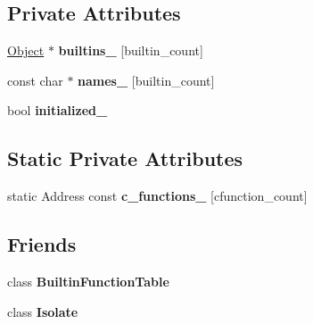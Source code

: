 \subsection*{Private Attributes}
\begin{DoxyCompactItemize}
\item 
\hyperlink{classv8_1_1internal_1_1_object}{Object} $\ast$ {\bfseries builtins\+\_\+} \mbox{[}builtin\+\_\+count\mbox{]}\hypertarget{classv8_1_1internal_1_1_builtins_a417f3c630e4ec2cf76865fc58a07a2e1}{}\label{classv8_1_1internal_1_1_builtins_a417f3c630e4ec2cf76865fc58a07a2e1}

\item 
const char $\ast$ {\bfseries names\+\_\+} \mbox{[}builtin\+\_\+count\mbox{]}\hypertarget{classv8_1_1internal_1_1_builtins_acb3e259bdc89c585809ee2ddd51b1332}{}\label{classv8_1_1internal_1_1_builtins_acb3e259bdc89c585809ee2ddd51b1332}

\item 
bool {\bfseries initialized\+\_\+}\hypertarget{classv8_1_1internal_1_1_builtins_abbabec72309682e4e80ca868298668d7}{}\label{classv8_1_1internal_1_1_builtins_abbabec72309682e4e80ca868298668d7}

\end{DoxyCompactItemize}
\subsection*{Static Private Attributes}
\begin{DoxyCompactItemize}
\item 
static Address const {\bfseries c\+\_\+functions\+\_\+} \mbox{[}cfunction\+\_\+count\mbox{]}
\end{DoxyCompactItemize}
\subsection*{Friends}
\begin{DoxyCompactItemize}
\item 
class {\bfseries Builtin\+Function\+Table}\hypertarget{classv8_1_1internal_1_1_builtins_a6bf55384c2c77dfdeecf52210335713e}{}\label{classv8_1_1internal_1_1_builtins_a6bf55384c2c77dfdeecf52210335713e}

\item 
class {\bfseries Isolate}\hypertarget{classv8_1_1internal_1_1_builtins_aba4f0964bdacf2bbf62cf876e5d28d0a}{}\label{classv8_1_1internal_1_1_builtins_aba4f0964bdacf2bbf62cf876e5d28d0a}

\end{DoxyCompactItemize}


